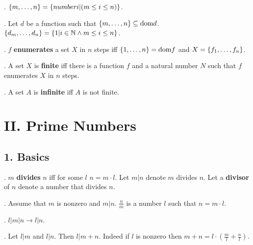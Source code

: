 \begin{definition}.
$\{m,\dots,n\} =\{ number i  | (m \leq i \leq n) \}$.
\end{definition}

\begin{definition}.
Let $d$ be a function such that $\{m,\dots,n\} \subseteq \text{dom} d$. 
$\{d_{m},\dots,d_{n}\} = \{ 1 | i \in {\Bbb N} \wedge m \leq i \leq n \}$.
\end{definition}

\begin{definition}.
$f$ {\bf enumerates} a set $X$ in $n$ steps iff
$\{1,\dots,n\} = \text{dom} f$ and $X=\{f_{1},\dots,f_{n}\}$.
\end{definition}

\begin{definition}.
A set $X$ is {\bf finite} iff there is a function $f$ and a natural number $N$ such that $f$ enumerates $X$ in $n$ steps.
\end{definition}

\begin{definition}.
A set $A$ is {\bf infinite} iff $A$ is not finite.
\end{definition}

\section{II. Prime Numbers}

\subsection{1. Basics}



\begin{definition}.
$m$ {\bf divides} $n$ iff for some $l$ $n = m \cdot l$.
Let $m | n$ denote $m$ divides $n$.
Let a {\bf divisor} of $n$ denote a number that divides $n$.
\end{definition}

\begin{definition}.
Assume that $m$ is nonzero and $m | n$.
$\frac{n}{m}$ is a number $l$ such that $n = m \cdot l$.
\end{definition}

\begin{lemma}.
$l | m | n \rightarrow l | n$.\end{lemma}

\begin{lemma}.
Let $l | m$ and $l | n$. Then $l | m + n$.
Indeed if $l$ is nonzero then 
$m + n = l \cdot (\frac{m}{l} + \frac{n}{l})$.
\end{lemma}

